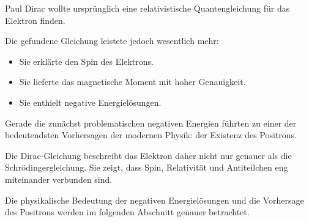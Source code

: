 \begin{HistoryBox}
	\label{box:unerwartete_folgen_diracgleichung}
	
	Paul Dirac wollte ursprünglich eine relativistische
	Quantengleichung für das Elektron finden.
	
	Die gefundene Gleichung leistete jedoch wesentlich mehr:
	
	\begin{itemize}
		\item Sie erklärte den Spin des Elektrons.
		\item Sie lieferte das magnetische Moment mit hoher Genauigkeit.
		\item Sie enthielt negative Energielösungen.
	\end{itemize}
	
	Gerade die zunächst problematischen negativen Energien führten zu einer
	der bedeutendsten Vorhersagen der modernen Physik: der Existenz des
	Positrons.
\end{HistoryBox}

Die Dirac-Gleichung beschreibt das Elektron daher nicht nur genauer als
die Schrödingergleichung. Sie zeigt, dass Spin, Relativität und
Antiteilchen eng miteinander verbunden sind.

Die physikalische Bedeutung der negativen Energielösungen und die
Vorhersage des Positrons werden im folgenden Abschnitt genauer
betrachtet.
